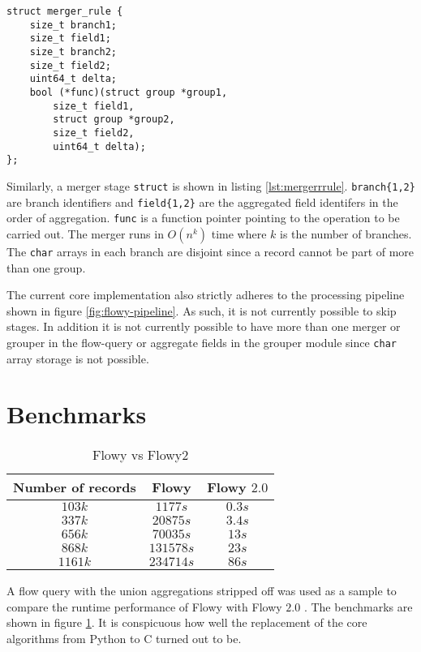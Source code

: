 \begin{lstlisting}
struct merger_rule {
	size_t branch1;
	size_t field1;
	size_t branch2;
	size_t field2;
	uint64_t delta;
	bool (*func)(struct group *group1,
		size_t field1,
		struct group *group2,
		size_t field2,
		uint64_t delta);
};
\end{lstlisting}

Similarly, a merger stage \texttt{struct} is shown in listing \ref{lst:mergerrrule}. \texttt{branch\{1,2\}} are branch identifiers and \texttt{field\{1,2\}} are the aggregated field identifers in the order of aggregation. \texttt{func} is a function pointer pointing to the operation to be carried out. The merger  runs in $O(n^k)$ time where $k$ is the number of branches. The \texttt{char} arrays in each branch are disjoint since a record cannot be part of more than one group.

The current core implementation also strictly adheres to the processing pipeline shown in figure \ref{fig:flowy-pipeline}. As such, it is not currently possible to skip  stages. In addition it is not currently possible to have more than one merger or grouper in the flow-query or aggregate fields in the grouper module since \texttt{char} array storage is not possible.

\section{Benchmarks}\label{sec:benchmarks}
\begin{table}[h!]
	\begin{center}
		\begin{tabular}{|c|c|c|}
		\hline
		Number of records & Flowy & Flowy $2.0$ \\
		\hline
		\hline
		$103k$ & $1177s$ & $0.3s$\\
		\hline
		$337k$ & $20875s$ & $3.4s$\\
		\hline
		$656k$ & $70035s$ & $13s$\\
		\hline
		$868k$ & $131578s$ & $23s$\\
		\hline
		$1161k$ & $234714s$ & $86s$\\
		\hline
		\end{tabular}
	\end{center}
\caption{Flowy vs Flowy2 \cite{jschauer:thesis:2011}}
\label{tab:flowy2-benchmarks}
\end{table}
A flow query with the union aggregations stripped off was used as a sample to compare the runtime performance of Flowy \cite{kkanev:thesis:2009} with Flowy $2.0$  \cite{jschauer:thesis:2011}. The benchmarks are shown in figure \ref{tab:flowy2-benchmarks}. It is conspicuous how well the replacement of the core algorithms from Python to C turned out to be.

